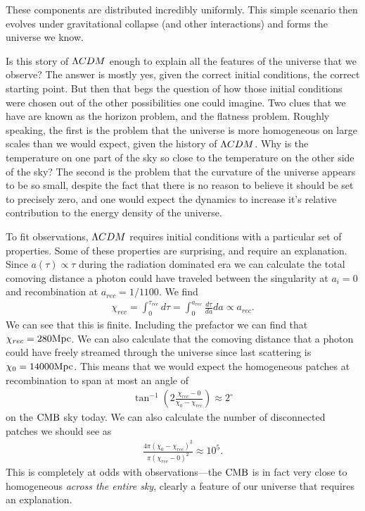     These components are distributed incredibly uniformly. This simple scenario then evolves
    under gravitational collapse (and other interactions) and forms the universe we know.


    Is this story of $\Lambda CDM$ enough to explain all the features of the
    universe that we observe? The answer is mostly yes, given the correct initial conditions,
    the correct starting point. But then that begs the question of how those initial conditions
    were chosen out of the other possibilities one could imagine.
    Two clues that we have are known as the horizon problem, and the flatness problem.
    Roughly speaking, the first is the problem that the universe is more homogeneous on
    large scales than we would expect, given the history of $\Lambda CDM$. Why is the temperature on one
    part of the sky so close to the temperature on the other side of the sky?
    The second is the problem that the curvature of the universe appears to be so
    small, despite the fact that there is no reason to believe it should be set to precisely
    zero, and one would expect the dynamics to increase it's relative contribution to the
    energy density of the universe.


    To fit observations, $\Lambda CDM$ requires initial conditions with a particular set of properties.
    Some of these properties are surprising, and require an explanation.
    Since $a(\tau)\propto \tau$ during the radiation dominated era we can calculate
    the total comoving distance a photon could have traveled between the singularity at $a_i=0$
    and recombination at $a_{rec}=1/1100$. We find
    \begin{align}
        \chi_{rec} = \int_{0}^{\tau_{rec}} d \tau = \int_{0}^{a_{rec}} \frac{d\tau}{da}da \propto a_{rec}.
    \end{align}
    We can see that this is finite.
    Including the prefactor we can find that $\chi_{rec}=280\text{Mpc}$.
    We can also calculate that the comoving distance that a photon could have
    freely streamed through the universe since
    last scattering is $\chi_0=14000\text{Mpc}$.
    This means that we would expect the homogeneous patches at recombination to span
    at most an angle of
    \begin{align}
        \tan^{-1}\left(2\frac{\chi_{rec}-0}{\chi_{0}-\chi_{rec}}\right) \approx 2^{\circ}
    \end{align}
    on the $\text{CMB}$ sky today. We can also calculate the number of disconnected patches
    we should see as
    \begin{align}
        \frac{4\pi(\chi_{0}-\chi_{rec})^2}{\pi(\chi_{rec}-0)^2} \approx 10^5.
    \end{align}
    This is completely at odds with observations---the $\text{CMB}$ is in fact very close to
    homogeneous \textit{across the entire sky}, clearly a feature of our universe
    that requires an explanation.


